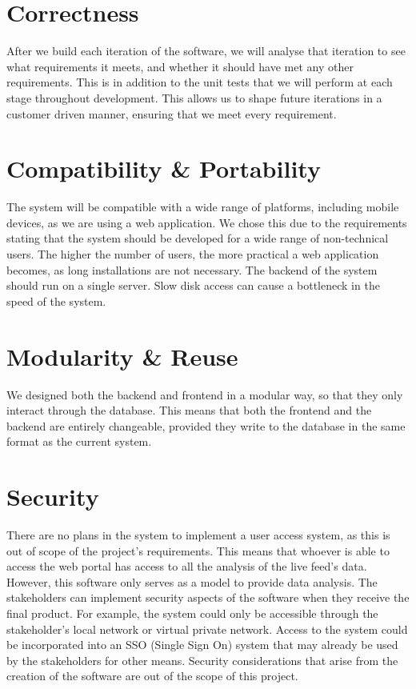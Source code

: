 \documentclass[11pt, oneside, a4paper]{article}
\begin{document}
\section{Correctness}
After we build each iteration of the software, we will analyse that iteration to
see what requirements it meets, and whether it should have met any other requirements.
This is in addition to the unit tests that we will perform at each stage throughout
development. This allows us to shape future iterations in a customer driven manner,
ensuring that we meet every requirement.

\section{Compatibility \& Portability}
The system will be compatible with a wide range of platforms, including mobile
devices, as we are using a web application. We chose this due to the requirements
stating that the system should be developed for a wide range of non-technical users.
The higher the number of users, the more practical a web application becomes, as
long installations are not necessary. The backend of the system should run on a
single server. Slow disk access can cause a bottleneck in the speed of the system.

\section{Modularity \& Reuse}
We designed both the backend and frontend in a modular way, so that they only
interact through the database. This means that both the frontend and the backend
are entirely changeable, provided they write to the database in the same format
as the current system.

\section{Security}
There are no plans in the system to implement a user access system, as this is out
of scope of the project’s requirements. This means that whoever is able to access
the web portal has access to all  the analysis of the live feed’s data. However,
this software only serves as a model to provide data analysis. The stakeholders
can implement security aspects of the software when they receive the final product.
For example, the system could only be accessible through the stakeholder’s local
network or virtual private network. Access to the system could be incorporated
into an SSO (Single Sign On) system that may already be used by the stakeholders for
other means. Security considerations that arise from the creation of the software
are out of the scope of this project.
\end{document}
